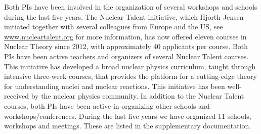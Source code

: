 Both PIs have been involved in the organization of several workshops
and schools during the last five years.  The Nuclear Talent
initiative, which Hjorth-Jensen initiated together with several
colleagues from Europe and the US, see \url{www.nucleartalent.org} for
more information, has now offered eleven courses in Nuclear Theory
since 2012, with approximately 40 applicants per course. Both PIs have
been active teachers and organizers of several Nuclear Talent
courses. This initiative has developed a broad nuclear physics curriculum, taught
through intensive three-week courses, that provides the
platform for a cutting-edge theory for understanding nuclei and
nuclear reactions.  This initiative has been well-received by the
nuclear physics community. In addition to the Nuclear Talent courses,
both PIs have been active in organizing other schools and
workshops/conferences.  During the last five years we have organized
11 schools, workshops and meetings. These are listed in the supplementary documentation.
